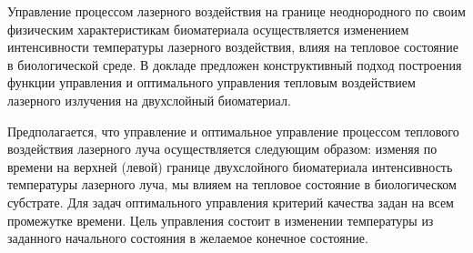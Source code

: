 



Управление процессом лазерного воздействия на границе
неоднородного по своим физическим характеристикам биоматериала
осуществляется изменением интенсивности температуры лазерного
воздействия, влияя на тепловое состояние в биологической среде. В докладе предложен
конструктивный подход построения функции управления и оптимального
управления тепловым воздействием лазерного излучения на двухслойный биоматериал.

Предполагается,
что управление и оптимальное управление процессом теплового воздействия
лазерного луча осуществляется следующим образом: изменяя по времени на
верхней (левой) границе двухслойного биоматериала интенсивность
температуры лазерного луча, мы влияем на тепловое состояние в
биологическом субстрате. Для задач оптимального управления критерий
качества задан на всем промежутке времени. Цель управления состоит в изменении температуры из заданного начального состояния   в желаемое конечное состояние.

\iffalse
\begin{thebibliography}{99}
\bibitem{1}
Author1 N., Author2 N.  Article title. Journal. Year. Vol.~Volume, No~Number. Pp.~Page numbers.
\bibitem{2}
Author N. Book title. Place: Publisher, year.
\bibitem{3} Фамилия И.О. Название статьи~// Журнал. Год. Т.~том,  \textnumero~номер. С.~страницы.
\end{thebibliography}
\fi





%
